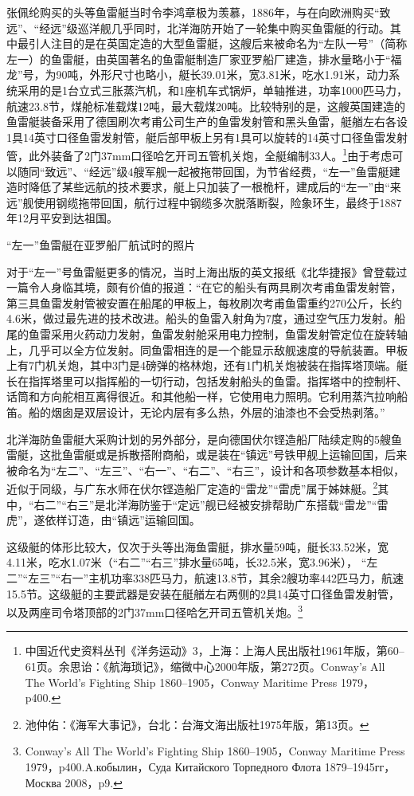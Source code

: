 \documentclass[12pt,UTF8]{ctexbook}
\begin{document}
张佩纶购买的头等鱼雷艇当时令李鸿章极为羡慕，1886年，与在向欧洲购买“致远”、“经远”级巡洋舰几乎同时，北洋海防开始了一轮集中购买鱼雷艇的行动。其中最引人注目的是在英国定造的大型鱼雷艇，这艘后来被命名为“左队一号”（简称左一）的鱼雷艇，由英国著名的鱼雷艇制造厂家亚罗船厂建造，排水量略小于“福龙”号，为90吨，外形尺寸也略小，艇长39.01米，宽3.81米，吃水1.91米，动力系统采用的是1台立式三胀蒸汽机，和1座机车式锅炉，单轴推进，功率1000匹马力，航速23.8节，煤舱标准载煤12吨，最大载煤20吨。比较特别的是，这艘英国建造的鱼雷艇装备采用了德国刷次考甫公司生产的鱼雷发射管和黑头鱼雷，艇艏左右各设1具14英寸口径鱼雷发射管，艇后部甲板上另有1具可以旋转的14英寸口径鱼雷发射管，此外装备了2门37mm口径哈乞开司五管机关炮，全艇编制33人。\footnote{中国近代史资料丛刊《洋务运动》3，上海：上海人民出版社1961年版，第60--61页。余思诒：《航海琐记》，缩微中心2000年版，第272页。Conway's All The World's Fighting Ship 1860--1905，Conway Maritime Press 1979，p400.}由于考虑可以随同“致远”、“经远”级4艘军舰一起被拖带回国，为节省经费，“左一”鱼雷艇建造时降低了某些远航的技术要求，艇上只加装了一根桅杆，建成后的“左一”由“来远”舰使用钢缆拖带回国，航行过程中钢缆多次脱落断裂，险象环生，最终于1887年12月平安到达祖国。

“左一”鱼雷艇在亚罗船厂航试时的照片

对于“左一”号鱼雷艇更多的情况，当时上海出版的英文报纸《北华捷报》曾登载过一篇令人身临其境，颇有价值的报道：“在它的船头有两具刷次考甫鱼雷发射管，第三具鱼雷发射管被安置在船尾的甲板上，每枚刷次考甫鱼雷重约270公斤，长约4.6米，做过最先进的技术改进。船头的鱼雷入射角为7度，通过空气压力发射。船尾的鱼雷采用火药动力发射，鱼雷发射舱采用电力控制，鱼雷发射管定位在旋转轴上，几乎可以全方位发射。同鱼雷相连的是一个能显示敌舰速度的导航装置。甲板上有7门机关炮，其中3门是4磅弹的格林炮，还有1门机关炮被装在指挥塔顶端。艇长在指挥塔里可以指挥船的一切行动，包括发射船头的鱼雷。指挥塔中的控制杆、话筒和方向舵相互离得很近。和其他船一样，它使用电力照明。它利用蒸汽拉响船笛。船的烟囱是双层设计，无论内层有多么热，外层的油漆也不会受热剥落。”

北洋海防鱼雷艇大采购计划的另外部分，是向德国伏尔铿造船厂陆续定购的5艘鱼雷艇，这批鱼雷艇或是拆散搭附商船，或是装在“镇远”号铁甲舰上运输回国，后来被命名为“左二”、“左三”、“右一”、“右二”、“右三”，设计和各项参数基本相似，近似于同级，与广东水师在伏尔铿造船厂定造的“雷龙”“雷虎”属于姊妹艇。\footnote{池仲佑：《海军大事记》，台北：台海文海出版社1975年版，第13页。}其中，“右二”“右三”是北洋海防鉴于“定远”舰已经被安排帮助广东搭载“雷龙”“雷虎”，遂依样订造，由“镇远”运输回国。

这级艇的体形比较大，仅次于头等出海鱼雷艇，排水量59吨，艇长33.52米，宽4.11米，吃水1.07米（“右二”“右三”排水量65吨，长32.5米，宽3.96米）， “左二”“左三”“右一”主机功率338匹马力，航速13.8节，其余2艘功率442匹马力，航速15.5节。这级艇的主要武器是安装在艇艏左右两侧的2具14英寸口径鱼雷发射管，以及两座司令塔顶部的2门37mm口径哈乞开司五管机关炮。\footnote{Conway's All The World's Fighting Ship 1860--1905，Conway Maritime Press 1979，p400.\cyrillicfont A.кобылин，Суда Китайского Торпедного Флота 1879--1945гг，Москва 2008，p9.}
\end{document}
